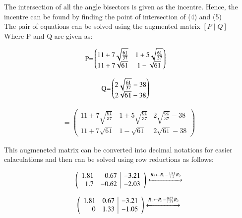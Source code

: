 \documentclass[journal,12pt,twocolumn]{IEEEtran}
\theoremstyle{remark}
\begin{document}
\begin{flushleft}
    The intersection of all the angle bisectors is given as the incentre.
Hence, the incentre can be found by finding the point of intersection of (4) and (5)
\\
The pair of equations can be solved using the augmented matrix $[P \mid Q]$\\
Where P and Q are given as:
\end{flushleft}

\begin{align}
	\text{P=}&\begin{pmatrix}
		11 + 7\sqrt{\frac{61}{37}} & 1 + 5\sqrt{\frac{61}{37}}\\
		11 + 7\sqrt{61} & 1 - \sqrt{61}
	\end{pmatrix}
\end{align}

\begin{align}
	\text{Q=}&\begin{pmatrix}
		2\sqrt{\frac{61}{37}}-38\\
		2\sqrt{61}-38
	\end{pmatrix}
\end{align}

\begin{align}
	[P \mid Q]=
	\left(
\begin{array}{rr|r}
	11 + 7\sqrt{\frac{61}{37}} & 1 + 5\sqrt{\frac{61}{37}} & 2\sqrt{\frac{61}{37}}-38\\
		11 + 7\sqrt{61} & 1 - \sqrt{61} & 2\sqrt{61}-38
\end{array}
	\right)
\end{align}

\begin{flushleft}
	This augmeneted matrix can be converted into decimal notations for easier calaculations
	and then can be solved using row reductions as follows:
\end{flushleft}
\begin{align*}
	\left(
\begin{array}{rr|r}
	1.81 & 0.67 & -3.21\\
	1.7& -0.62 & -2.03
\end{array}
	\right)
\xleftrightarrow[]{R_2 \leftarrow R_{1} - \frac{1.81}{1.7} R_{2}}
\end{align*}

\begin{align*}
\left(
	\begin{array}{rr|r}
		1.81 & 0.67 & -3.21\\
		0& 1.33 & -1.05
	\end{array}
		\right)
\xleftrightarrow[]{R_{1} \leftarrow R_{1} - \frac{0.67}{1.33} R_{2}}
\end{align*}
\end{document}
